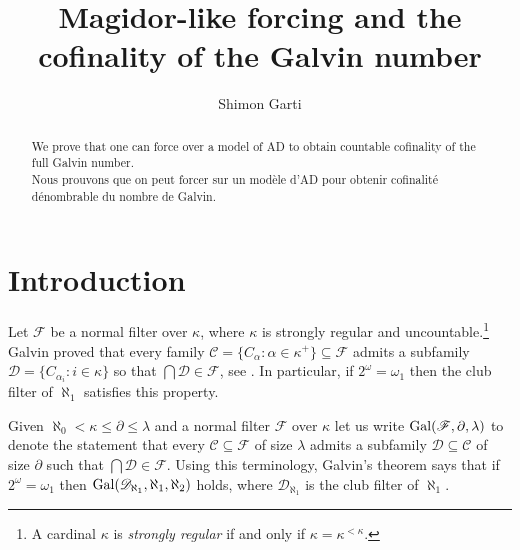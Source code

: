 \documentclass[11pt]{amsart}
\title{Magidor-like forcing and the cofinality of the Galvin number}
\author{Shimon Garti}
\theoremstyle{definition}
\theoremstyle{remark}
\begin{document}
\let\labeloriginal\label
\let\reforiginal\ref
\def\ref#1{\reforiginal{#1}}
\def\label#1{\labeloriginal{#1}}

\begin{abstract}
We prove that one can force over a model of \textsf{AD} to obtain countable cofinality of the full Galvin number. \\
Nous prouvons que on peut forcer sur un mod\`ele d'AD pour obtenir cofinalit\'e d\'enombrable du nombre de Galvin.
\end{abstract}

\maketitle

\newpage

\section{Introduction}

Let $\mathscr{F}$ be a normal filter over $\kappa$, where $\kappa$ is strongly regular and uncountable.\footnote{A cardinal $\kappa$ is \emph{strongly regular} if and only if $\kappa=\kappa^{<\kappa}$.}
Galvin proved that every family $\mathcal{C}=\{C_\alpha:\alpha\in\kappa^+\}\subseteq\mathscr{F}$ admits a subfamily $\mathcal{D}=\{C_{\alpha_i}:i\in\kappa\}$ so that $\bigcap\mathcal{D}\in\mathscr{F}$, see \cite{MR0369081}.
In particular, if $2^\omega=\omega_1$ then the club filter of $\aleph_1$ satisfies this property.

Given $\aleph_0<\kappa\leq\partial\leq\lambda$ and a normal filter $\mathscr{F}$ over $\kappa$ let us write ${\rm Gal}(\mathscr{F},\partial,\lambda)$ to denote the statement that every $\mathcal{C}\subseteq\mathscr{F}$ of size $\lambda$ admits a subfamily $\mathcal{D}\subseteq\mathcal{C}$ of size $\partial$ such that $\bigcap\mathcal{D}\in\mathscr{F}$.
Using this terminology, Galvin's theorem says that if $2^\omega=\omega_1$ then ${\rm Gal}(\mathscr{D}_{\aleph_1},\aleph_1,\aleph_2)$ holds, where $\mathscr{D}_{\aleph_1}$ is the club filter of $\aleph_1$.
\end{document}

